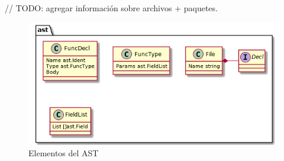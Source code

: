 // TODO: agregar información sobre archivos + paquetes.

\begin{figure}[H]
  \includegraphics[width=12cm]{implementation/elements}
  \centering
  \caption{Elementos del AST}
\end{figure}
